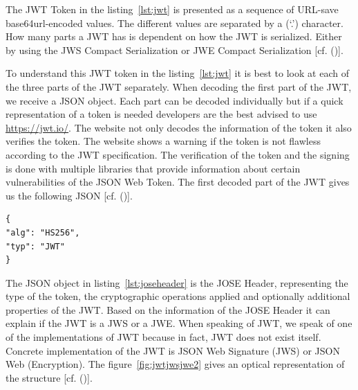 \goodbreak

The JWT Token in the listing~\ref{lst:jwt} is presented as a sequence of URL-save base64url-encoded values. The different values are separated by a (‘.’) character. How many parts a JWT has is dependent on how the JWT is serialized. Either by using the JWS Compact Serialization or JWE Compact Serialization [cf. (\cite{JWT:IETF:Jones:2015})].


To understand this JWT token in the listing~\ref{lst:jwt} it is best to look at each of the three parts of the JWT separately. When decoding the first part of the JWT, we receive a JSON object. Each part can be decoded individually but if a quick representation of a token is needed developers are the best advised to use \href{https://jwt.io/} {https://jwt.io/}. The website not only decodes the information of the token it also verifies the token. The website shows a warning if the token is not flawless according to the JWT specification. The verification of the token and the signing is done with multiple libraries that provide information about certain vulnerabilities of the JSON Web Token. The first decoded part of the JWT gives us the following JSON [cf. (\cite{JWT:IETF:Jones:2015})].


\begin{lstlisting}
{
"alg": "HS256",
"typ": "JWT"
}
\end{lstlisting}


The JSON object in listing~\ref{lst:joseheader} is the JOSE Header, representing the type of the token, the cryptographic operations applied and optionally additional properties of the JWT. Based on the information of the JOSE Header it can explain if the JWT is a JWS or a JWE. When speaking of JWT, we speak of one of the implementations of JWT because in fact, JWT does not exist itself. Concrete implementation of the JWT is JSON Web Signature (JWS) or JSON Web (Encryption). The figure~\ref{fig:jwtjwsjwe2} gives an optical representation of the structure [cf. (\cite{Siriwardena:JWTJWSJWE:2016})].


